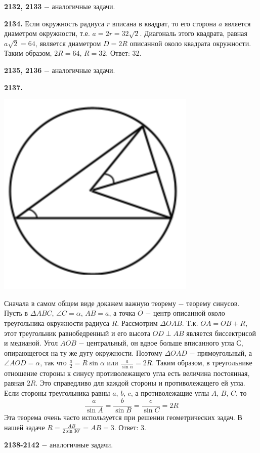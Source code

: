\textbf{2132, 2133} $-$ аналогичные задачи.

\textbf{2134.} Если окружность радиуса $r$ вписана в  квадрат, то его сторона $a$ является диаметром окружности, т.е. $a=2r=32\sqrt{2}$. Диагональ этого квадрата, равная $a\sqrt{2}=64$, является диаметром $D=2R$ описанной около квадрата окружности. Таким образом, $2R=64$, $R=32$. \newline \null \hspace*{\fill} Ответ: 32.

\textbf{2135, 2136} $-$ аналогичные задачи.

\textbf{2137.}

{\centering \includegraphics[width=0.4\linewidth]{Geometry/Content/42.png}
	
}

Сначала в самом общем виде докажем важную теорему $-$ теорему синусов.  Пусть в $\Delta ABC$, $\angle C = \alpha$, $AB=a$, а точка $O$ $-$ центр описанной около треугольника окружности радиуса $R$. Рассмотрим $\Delta OAB$. Т.к. $OA=OB+R$, этот треугольник равнобедренный и его высота $OD \perp AB$ является биссектрисой и медианой. Угол $AOB$ $-$ центральный, он вдвое больше вписанного угла $С$, опирающегося на ту же дугу окружности. Поэтому $\Delta OAD$ $-$ прямоугольный, а $\angle AOD=\alpha$, так что $\frac{a}{2}=R\sin{\alpha}$ или $\frac{a}{\sin{\alpha}}=2R$. Таким образом, в треугольнике отношение стороны к синусу противолежащего угла есть величина постоянная, равная $2R$. Это справедливо для  каждой стороны и противолежащего ей угла. Если стороны треугольника равны $a$, $b$, $c$, а противолежащие углы $A$, $B$, $C$, то 
\[
\frac{a}{\sin{A}}=\frac{b}{\sin{B}}=\frac{c}{\sin{C}}=2R
\]
Эта теорема очень часто используется при решении геометрических задач. В нашей задаче $R = \frac{AB}{2\sin{30^\circ}}=AB=3$. \newline \null \hspace*{\fill} Ответ: 3.

\textbf{2138-2142} $-$ аналогичные задачи.

